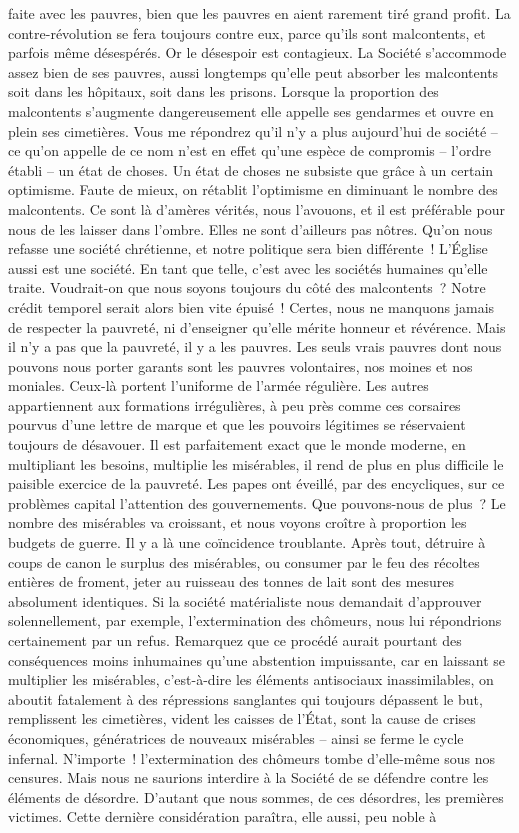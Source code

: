 \documentclass[french,twoside]{book} %
\begin{document}
faite avec les pauvres, bien que les pauvres en aient rarement tiré grand profit. La contre-révolution se fera toujours contre eux, parce qu’ils sont malcontents, et parfois même désespérés. Or le désespoir est contagieux. La Société s’accommode assez bien de ses pauvres, aussi longtemps qu’elle peut absorber les malcontents soit dans les hôpitaux, soit dans les prisons. Lorsque la proportion des malcontents s’augmente dangereusement elle appelle ses gendarmes et ouvre en plein ses cimetières. Vous me répondrez qu’il n’y a plus aujourd’hui de société – ce qu’on appelle de ce nom n’est en effet qu’une espèce de compromis – l’ordre établi – un état de choses. Un état de choses ne subsiste que grâce à un certain optimisme. Faute de mieux, on rétablit l’optimisme en diminuant le nombre des malcontents. Ce sont là d’amères vérités, nous l’avouons, et il est préférable pour nous de les laisser dans l’ombre. Elles ne sont d’ailleurs pas nôtres. Qu’on nous refasse une société chrétienne, et notre politique sera bien différente ! L’Église aussi est une société. En tant que telle, c’est avec les sociétés humaines qu’elle traite. Voudrait-on que nous soyons toujours du côté des malcontents ? Notre crédit temporel serait alors bien vite épuisé ! Certes, nous ne manquons jamais de respecter la pauvreté, ni d’enseigner qu’elle mérite honneur et révérence. Mais il n’y a pas que la pauvreté, il y a les pauvres. Les seuls vrais pauvres dont nous pouvons nous porter garants sont les pauvres volontaires, nos moines et nos moniales. Ceux-là portent l’uniforme de l’armée régulière. Les autres appartiennent aux formations irrégulières, à peu près comme ces corsaires pourvus d’une lettre de marque et que les pouvoirs légitimes se réservaient toujours de désavouer. Il est parfaitement exact que le monde moderne, en multipliant les besoins, multiplie les misérables, il rend de plus en plus difficile le paisible exercice de la pauvreté. Les papes ont éveillé, par des encycliques, sur ce problèmes capital l’attention des gouvernements. Que pouvons-nous de plus ? Le nombre des misérables va croissant, et nous voyons croître à proportion les budgets de guerre. Il y a là une coïncidence troublante. Après tout, détruire à coups de canon le surplus des misérables, ou consumer par le feu des récoltes entières de froment, jeter au ruisseau des tonnes de lait sont des mesures absolument identiques. Si la société matérialiste nous demandait d’approuver solennellement, par exemple, l’extermination des chômeurs, nous lui répondrions certainement par un refus. Remarquez que ce procédé aurait pourtant des conséquences moins inhumaines qu’une abstention impuissante, car en laissant se multiplier les misérables, c’est-à-dire les éléments antisociaux inassimilables, on aboutit fatalement à des répressions sanglantes qui toujours dépassent le but, remplissent les cimetières, vident les caisses de l’État, sont la cause de crises économiques, génératrices de nouveaux misérables – ainsi se ferme le cycle infernal. N’importe ! l’extermination des chômeurs tombe d’elle-même sous nos censures. Mais nous ne saurions interdire à la Société de se défendre contre les éléments de désordre. D’autant que nous sommes, de ces désordres, les premières victimes. Cette dernière considération paraîtra, elle aussi, peu noble à 
\end{document}
